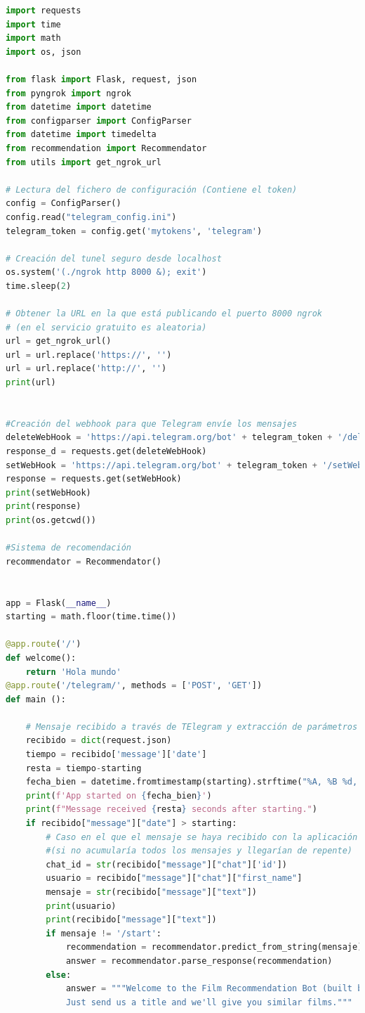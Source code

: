 \begin{lstlisting}[language=Python, label = {lst:API}, caption= Creación de la API del sistema de recomendación en Python usando Flask.]
import requests
import time
import math
import os, json

from flask import Flask, request, json
from pyngrok import ngrok
from datetime import datetime
from configparser import ConfigParser
from datetime import timedelta
from recommendation import Recommendator
from utils import get_ngrok_url

# Lectura del fichero de configuración (Contiene el token)
config = ConfigParser()
config.read("telegram_config.ini")
telegram_token = config.get('mytokens', 'telegram')

# Creación del tunel seguro desde localhost
os.system('(./ngrok http 8000 &); exit')
time.sleep(2)

# Obtener la URL en la que está publicando el puerto 8000 ngrok
# (en el servicio gratuito es aleatoria)
url = get_ngrok_url()
url = url.replace('https://', '')
url = url.replace('http://', '')
print(url)


#Creación del webhook para que Telegram envíe los mensajes
deleteWebHook = 'https://api.telegram.org/bot' + telegram_token + '/deleteWebHook'
response_d = requests.get(deleteWebHook)
setWebHook = 'https://api.telegram.org/bot' + telegram_token + '/setWebHook?url=' + url+'/telegram/'
response = requests.get(setWebHook)
print(setWebHook)
print(response)
print(os.getcwd())

#Sistema de recomendación
recommendator = Recommendator()


app = Flask(__name__)
starting = math.floor(time.time())

@app.route('/')
def welcome():
    return 'Hola mundo'
@app.route('/telegram/', methods = ['POST', 'GET'])
def main ():
    
    # Mensaje recibido a través de TElegram y extracción de parámetros importantes
    recibido = dict(request.json)
    tiempo = recibido['message']['date']
    resta = tiempo-starting
    fecha_bien = datetime.fromtimestamp(starting).strftime("%A, %B %d, %Y %I:%M:%S")
    print(f'App started on {fecha_bien}')
    print(f"Message received {resta} seconds after starting.")
    if recibido["message"]["date"] > starting:
        # Caso en el que el mensaje se haya recibido con la aplicación operativa
        #(si no acumularía todos los mensajes y llegarían de repente)
        chat_id = str(recibido["message"]["chat"]['id'])
        usuario = recibido["message"]["chat"]["first_name"]
        mensaje = str(recibido["message"]["text"])
        print(usuario)
        print(recibido["message"]["text"])
        if mensaje != '/start':
            recommendation = recommendator.predict_from_string(mensaje)
            answer = recommendator.parse_response(recommendation)
        else:
            answer = """Welcome to the Film Recommendation Bot (built by Gonzalo Izaguirre).\n
            Just send us a title and we'll give you similar films."""
        

\end{lstlisting}
